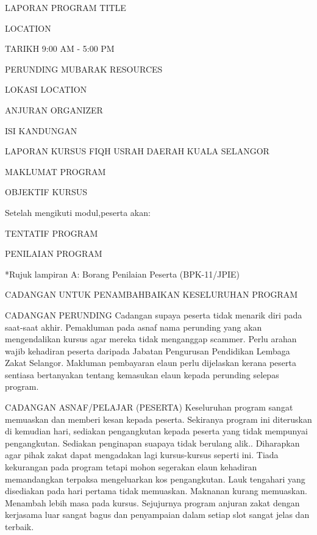 



LAPORAN PROGRAM TITLE

LOCATION


TARIKH
9:00 AM - 5:00 PM


PERUNDING MUBARAK RESOURCES



LOKASI
LOCATION

ANJURAN
ORGANIZER

ISI KANDUNGAN


LAPORAN KURSUS FIQH USRAH DAERAH KUALA SELANGOR

MAKLUMAT PROGRAM





OBJEKTIF KURSUS



Setelah mengikuti modul,peserta akan:

TENTATIF PROGRAM












PENILAIAN PROGRAM




*Rujuk lampiran A: Borang Penilaian Peserta (BPK-11/JPIE)

CADANGAN UNTUK PENAMBAHBAIKAN KESELURUHAN PROGRAM

CADANGAN PERUNDING
Cadangan supaya peserta tidak menarik diri pada saat-saat akhir.
Pemakluman pada asnaf nama perunding yang akan mengendalikan kursus agar mereka tidak menganggap scammer.
Perlu arahan wajib kehadiran peserta daripada Jabatan Pengurusan Pendidikan Lembaga Zakat Selangor.
Makluman pembayaran elaun perlu dijelaskan kerana peserta sentiasa bertanyakan tentang kemasukan elaun kepada perunding selepas program.


CADANGAN ASNAF/PELAJAR (PESERTA)
Keseluruhan program sangat memuaskan dan memberi kesan kepada peserta.
Sekiranya program ini diteruskan di kemudian hari, sediakan pengangkutan kepada peserta yang tidak mempunyai pengangkutan.
Sediakan penginapan suapaya tidak berulang alik..
Diharapkan agar pihak zakat dapat mengadakan lagi kursus-kursus seperti ini.
Tiada kekurangan pada program tetapi mohon segerakan elaun kehadiran memandangkan terpaksa mengeluarkan kos pengangkutan.
Lauk tengahari yang disediakan pada hari pertama tidak memuaskan.
Maknanan kurang memuaskan.
Menambah lebih masa pada kursus.
Sejujurnya program anjuran zakat dengan kerjasama luar sangat bagus dan penyampaian dalam setiap slot sangat jelas dan terbaik.

